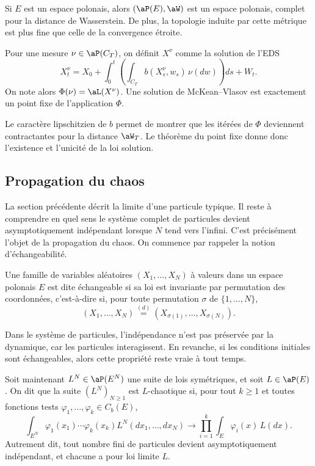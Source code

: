 \begin{thm}{}{}
	Si $E$ est un espace polonais, alors $(\aP(E), \aW)$ est un espace polonais, complet pour la distance de Wasserstein. De plus, la topologie induite par cette métrique est plus fine que celle de la convergence étroite.
\end{thm}

Pour une mesure $\nu\in\aP(C_T)$, on définit $X^\nu$ comme la solution de l'EDS
\[
	X_t^\nu
	=
	X_0
	+
	\int_0^t
	\left(
	\int_{C_T}
	b(X_s^\nu,w_s)\,\nu(dw)
	\right)ds
	+
	W_t.
\]
On note alors $\Phi(\nu)=\aL(X^\nu)$. Une solution de McKean--Vlasov est exactement un
point fixe de l'application $\Phi$.

Le caractère lipschitzien de $b$ permet de montrer que les itérées de $\Phi$ deviennent
contractantes pour la distance $\aW_T$. Le théorème du point fixe donne donc l'existence
et l'unicité de la loi solution.

\subsection{Propagation du chaos}

La section précédente décrit la limite d'une particule typique. Il reste à comprendre en
quel sens le système complet de particules devient asymptotiquement indépendant lorsque
$N$ tend vers l'infini. C'est précisément l'objet de la propagation du chaos. On commence par rappeler la notion d'échangeabilité.

\begin{defn}{}{}
	Une famille de variables aléatoires
	$(X_1,\dots,X_N)$ à valeurs dans un espace polonais $E$ est dite échangeable si sa loi est
	invariante par permutation des coordonnées, c'est-à-dire si, pour toute permutation
	$\sigma$ de $\{1,\dots,N\}$,
	\[
		(X_1,\dots,X_N)
		\overset{(d)}=
		(X_{\sigma(1)},\dots,X_{\sigma(N)}).
	\]
\end{defn}

Dans le système de particules, l'indépendance n'est pas préservée par la dynamique, car les
particules interagissent. En revanche, si les conditions initiales sont échangeables, alors
cette propriété reste vraie à tout temps.

Soit maintenant $L^N\in\aP(E^N)$ une suite de lois symétriques, et soit $L\in\aP(E)$.
On dit que la suite $(L^N)_{N\geq1}$ est $L$-chaotique si, pour tout $k\geq1$ et toutes
fonctions tests $\varphi_1,\dots,\varphi_k\in C_b(E)$,
\[
	\int_{E^N}
	\varphi_1(x_1)\cdots\varphi_k(x_k)
	L^N(dx_1,\dots,dx_N)
	\longrightarrow
	\prod_{i=1}^{k}
	\int_E
	\varphi_i(x)\,L(dx).
\]
Autrement dit, tout nombre fini de particules devient asymptotiquement indépendant, et
chacune a pour loi limite $L$.


